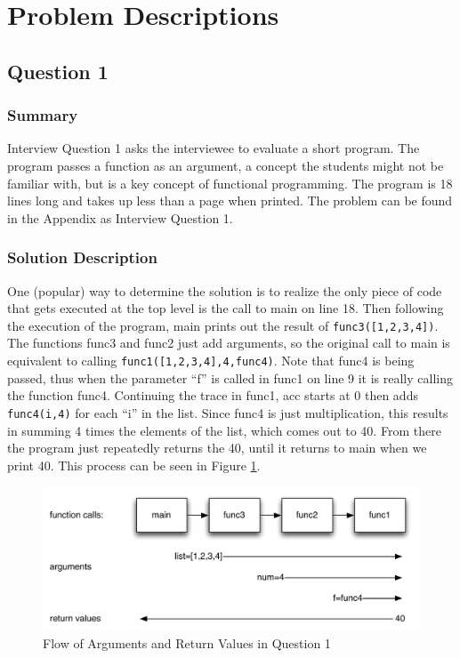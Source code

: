 \section{Problem Descriptions}


\subsection{Question 1}
\subsubsection{Summary}
Interview Question 1 asks the interviewee to evaluate a short program.
The program passes a function as an argument, a concept the students might not be familiar with, but is a key concept of functional programming.
The program is 18 lines long and takes up less than a page when printed.
The problem can be found in the Appendix as Interview Question 1.
\subsubsection{Solution Description}

One (popular) way to determine the solution is to realize the only piece of code that gets executed at the top level is the call to main on line 18.
Then following the execution of the program, main prints out the result of \texttt{func3([1,2,3,4])}.
The functions func3 and func2 just add arguments, so the original call to main is equivalent to calling \texttt{func1([1,2,3,4],4,func4)}.
Note that func4 is being passed, thus when the parameter ``f'' is called in func1 on line 9 it is really calling the function func4.
Continuing the trace in func1, acc starts at $0$ then adds \texttt{func4(i,4)} for each ``i'' in the list.
Since func4 is just multiplication, this results in summing 4 times the elements of the list, which comes out to 40.
From there the program just repeatedly returns the 40, until it returns to main when we print 40.
This process can be seen in Figure \ref{fig-q1}.

\begin{figure}[t]
\centering
\includegraphics[width=1.0\textwidth]{Q1diagram.pdf}
\caption{Flow of Arguments and Return Values in Question 1}
\label{fig-q1}
\end{figure}
 
